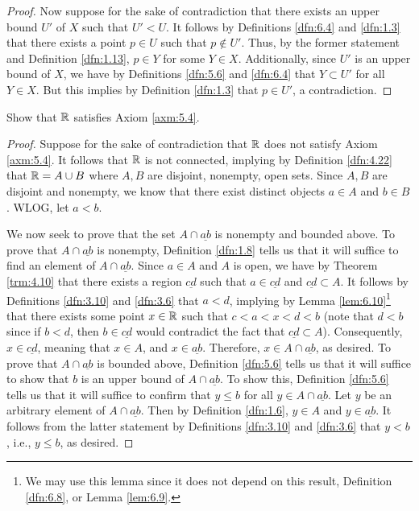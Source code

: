 \documentclass[../main.tex]{subfiles}
\begin{document}
\begin{lemma}
\begin{proof}
        Now suppose for the sake of contradiction that there exists an upper bound $U'$ of $X$ such that $U'<U$. It follows by Definitions \ref{dfn:6.4} and \ref{dfn:1.3} that there exists a point $p\in U$ such that $p\notin U'$. Thus, by the former statement and Definition \ref{dfn:1.13}, $p\in Y$ for some $Y\in X$. Additionally, since $U'$ is an upper bound of $X$, we have by Definitions \ref{dfn:5.6} and \ref{dfn:6.4} that $Y\subset U'$ for all $Y\in X$. But this implies by Definition \ref{dfn:1.3} that $p\in U'$, a contradiction.
    \end{proof}
\end{lemma}

\begin{exercise}\label{exr:6.7}
    Show that $\mathbb{R}$ satisfies Axiom \ref{axm:5.4}.
    \begin{proof}
        Suppose for the sake of contradiction that $\mathbb{R}$ does not satisfy Axiom \ref{axm:5.4}. It follows that $\mathbb{R}$ is not connected, implying by Definition \ref{dfn:4.22} that $\mathbb{R}=A\cup B$ where $A,B$ are disjoint, nonempty, open sets. Since $A,B$ are disjoint and nonempty, we know that there exist distinct objects $a\in A$ and $b\in B$. WLOG, let $a<b$.\par
        We now seek to prove that the set $A\cap\underline{ab}$ is nonempty and bounded above. To prove that $A\cap\underline{ab}$ is nonempty, Definition \ref{dfn:1.8} tells us that it will suffice to find an element of $A\cap\underline{ab}$. Since $a\in A$ and $A$ is open, we have by Theorem \ref{trm:4.10} that there exists a region $\underline{cd}$ such that $a\in\underline{cd}$ and $\underline{cd}\subset A$. It follows by Definitions \ref{dfn:3.10} and \ref{dfn:3.6} that $a<d$, implying by Lemma \ref{lem:6.10}\footnote{We may use this lemma since it does not depend on this result, Definition \ref{dfn:6.8}, or Lemma \ref{lem:6.9}.} that there exists some point $x\in\mathbb{R}$ such that $c<a<x<d<b$ (note that $d<b$ since if $b<d$, then $b\in\underline{cd}$ would contradict the fact that $\underline{cd}\subset A$). Consequently, $x\in\underline{cd}$, meaning that $x\in A$, and $x\in\underline{ab}$. Therefore, $x\in A\cap\underline{ab}$, as desired. To prove that $A\cap\underline{ab}$ is bounded above, Definition \ref{dfn:5.6} tells us that it will suffice to show that $b$ is an upper bound of $A\cap\underline{ab}$. To show this, Definition \ref{dfn:5.6} tells us that it will suffice to confirm that $y\leq b$ for all $y\in A\cap\underline{ab}$. Let $y$ be an arbitrary element of $A\cap\underline{ab}$. Then by Definition \ref{dfn:1.6}, $y\in A$ and $y\in\underline{ab}$. It follows from the latter statement by Definitions \ref{dfn:3.10} and \ref{dfn:3.6} that $y<b$, i.e., $y\leq b$, as desired.\par

\end{proof}
\end{exercise}
\end{document}
